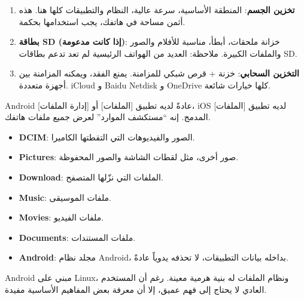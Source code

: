 


\begin{enumerate}
  \item \textbf{تخزين الجسم}: المنطقة الأساسية، سرعة عالية، النظام والتطبيقات كلها هنا. هذه أثمن مساحة في هاتفك، يجب استخدامها بحكمة.
  \item \textbf{بطاقة SD (إذا كانت مدعومة)}: خزانة ملحقات، أبطأ، مناسبة للأفلام والصور والملفات الكبيرة. ملاحظة: العديد من الهواتف الرئيسية لم تعد تدعم بطاقات SD.
  \item \textbf{التخزين السحابي}: خزنة + قرص شبكي للمزامنة. يمنع الفقد، ويمكنه المزامنة بين أجهزة متعددة. iCloud و Baidu Netdisk و OneDrive كلها خيارات شائعة.
\end{enumerate}


Android عادةً لديه تطبيق [الملفات] أو [إدارة الملفات]، iOS لديه تطبيق [الملفات] المدمج. إنه “مستكشف الموارد” لعرض جميع ملفات هاتفك.


\begin{itemize}
  \item \textbf{DCIM}: الصور والفيديوهات التي التقطتها الكاميرا.
  \item \textbf{Pictures}: صور أخرى، مثل لقطات الشاشة والصور المحفوظة.
  \item \textbf{Download}: الملفات التي نزّلها المتصفح.
  \item \textbf{Music}: ملفات الموسيقى.
  \item \textbf{Movies}: ملفات الفيديو.
  \item \textbf{Documents}: ملفات المستندات.
  \item \textbf{Android}: مجلد نظام Android، بداخله بيانات التطبيقات، لا تحذفه يدوياً عادةً.
\end{itemize}


Android مبني على Linux، ونظام الملفات له بنية هرمية معينة. رغم أن المستخدم العادي لا يحتاج إلى فهم عميق، إلا أن معرفة بعض المفاهيم الأساسية مفيدة.

